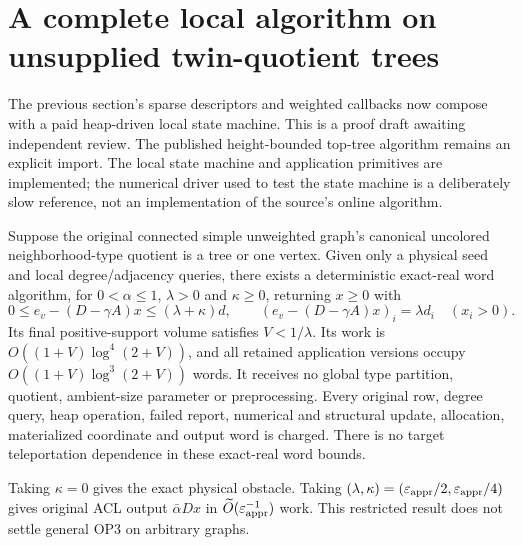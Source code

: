 \section{A complete local algorithm on unsupplied twin-quotient trees}
\label{sec:op3-local-twin-quotient-tree}

The previous section's sparse descriptors and weighted callbacks now
compose with a paid heap-driven local state machine. This is a
\statusproved{} proof draft awaiting independent review. The published
height-bounded top-tree algorithm remains an explicit \statussource{}
import. The local state machine and application primitives are implemented;
the numerical driver used to test the state machine is a deliberately slow
reference, not an implementation of the source's online algorithm.

\begin{theorem}
\label{thm:op3-local-twin-quotient-tree}
Suppose the original connected simple unweighted graph's canonical
uncolored neighborhood-type quotient is a tree or one vertex. Given only
a physical seed and local degree/adjacency queries, there exists a
deterministic exact-real word algorithm, for $0<\alpha\leq1$,
$\lambda>0$ and $\kappa\geq0$, returning $x\geq0$ with
\[
 0\leq e_v-(D-\gamma A)x\leq(\lambda+\kappa)d,
 \qquad (e_v-(D-\gamma A)x)_i=\lambda d_i\quad(x_i>0).
\]
Its final positive-support volume satisfies $V<1/\lambda$. Its work is
$O((1+V)\log^4(2+V))$, and all retained application versions occupy
$O((1+V)\log^3(2+V))$ words. It receives no global type partition, quotient,
ambient-size parameter or preprocessing. Every original row, degree query,
heap operation, failed report, numerical and structural update, allocation,
materialized coordinate and output word is charged. There is no target
teleportation dependence in these exact-real word bounds.

Taking $\kappa=0$ gives the exact physical obstacle. Taking
$(\lambda,\kappa)=(\varepsilon_{\mathrm{appr}}/2,\varepsilon_{\mathrm{appr}}/4)$ gives original ACL output
$\bar\alpha D x$ in $\widetilde O(\varepsilon_{\mathrm{appr}}^{-1})$ work. This restricted
result does not settle general OP3 on arbitrary graphs.
\end{theorem}
